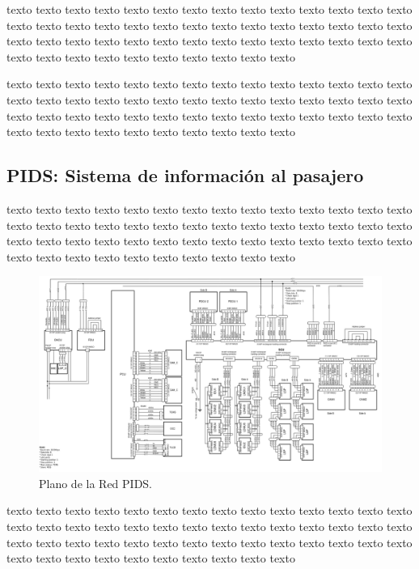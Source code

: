 \documentclass[
11pt, %
]{charter}
\begin{document}
texto texto texto texto texto texto texto texto texto texto texto texto texto texto texto texto texto texto texto texto texto texto texto texto texto texto texto texto texto texto texto texto texto texto texto texto texto texto texto texto texto texto texto texto texto texto texto texto texto texto texto texto 


texto texto texto texto texto texto texto texto texto texto texto texto texto texto texto texto texto texto texto texto texto texto texto texto texto texto texto texto texto texto texto texto texto texto texto texto texto texto texto texto texto texto texto texto texto texto texto texto texto texto texto texto 


\pagebreak
\subsection{PIDS: Sistema de información al pasajero}


texto texto texto texto texto texto texto texto texto texto texto texto texto texto texto texto texto texto texto texto texto texto texto texto texto texto texto texto texto texto texto texto texto texto texto texto texto texto texto texto texto texto texto texto texto texto texto texto texto texto texto texto 


\begin{figure}[htpb]
\centering 
\includegraphics[width=1\textwidth]{./Pics/PIDS_diagram.png}
\caption{Plano de la Red PIDS.}
\label{fig:Red PIDS}
\end{figure}

texto texto texto texto texto texto texto texto texto texto texto texto texto texto texto texto texto texto texto texto texto texto texto texto texto texto texto texto texto texto texto texto texto texto texto texto texto texto texto texto texto texto texto texto texto texto texto texto texto texto texto texto 
\end{document}
